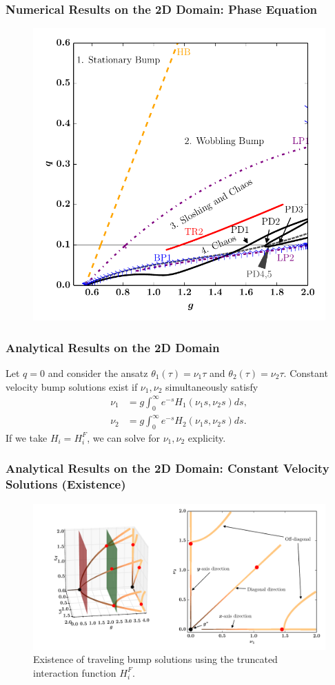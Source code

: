 \documentclass{beamer}
\begin{document}
\begin{frame}
\frametitle{Numerical Results on the 2D Domain: Phase Equation}
\begin{figure}
 \includegraphics[width=.6\textwidth]{twod_phase_auto_3terms_2par.pdf}

\end{figure}
\end{frame}



\begin{frame}
\frametitle{Analytical Results on the 2D Domain}
Let $q=0$ and consider the ansatz $\theta_1(\tau) = \nu_1\tau$ and $\theta_2(\tau) = \nu_2\tau$. Constant velocity bump solutions exist if $\nu_1,\nu_2$ simultaneously satisfy
\begin{equation*}
\begin{split}
 \nu_1 &=  g \int_0^\infty e^{-s} H_1(\nu_1 s,\nu_2 s) ds,\\
 \nu_2 &=  g \int_0^\infty e^{-s} H_2(\nu_1 s,\nu_2 s) ds.
\end{split}
\end{equation*}
If we take $H_i = H_i^F$, we can solve for $\nu_1,\nu_2$ explicity.
\end{frame}


\begin{frame}
\frametitle{Analytical Results on the 2D Domain: Constant Velocity Solutions (Existence)}
\begin{figure}
 \centering
 \includegraphics[width=.7\textwidth]{twod_wave_exist_trunc_v4.pdf}
 \caption{Existence of traveling bump solutions using the truncated interaction function $H_i^F$.}

 \end{figure}
\end{frame}
\end{document}
